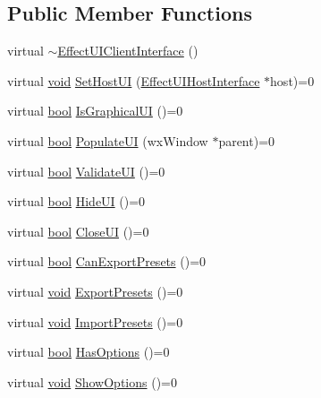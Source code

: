 \subsection*{Public Member Functions}
\begin{DoxyCompactItemize}
\item 
virtual \hyperlink{class_effect_u_i_client_interface_a1292c3f924bf688755da923aff85e106}{$\sim$\+Effect\+U\+I\+Client\+Interface} ()
\item 
virtual \hyperlink{sound_8c_ae35f5844602719cf66324f4de2a658b3}{void} \hyperlink{class_effect_u_i_client_interface_a486ec923d94d70b91278520903977152}{Set\+Host\+UI} (\hyperlink{class_effect_u_i_host_interface}{Effect\+U\+I\+Host\+Interface} $\ast$host)=0
\item 
virtual \hyperlink{mac_2config_2i386_2lib-src_2libsoxr_2soxr-config_8h_abb452686968e48b67397da5f97445f5b}{bool} \hyperlink{class_effect_u_i_client_interface_ac5bd459c397afc1d76576bfe282f90fe}{Is\+Graphical\+UI} ()=0
\item 
virtual \hyperlink{mac_2config_2i386_2lib-src_2libsoxr_2soxr-config_8h_abb452686968e48b67397da5f97445f5b}{bool} \hyperlink{class_effect_u_i_client_interface_ac9903541be5f74fa381e04923b9f97a6}{Populate\+UI} (wx\+Window $\ast$parent)=0
\item 
virtual \hyperlink{mac_2config_2i386_2lib-src_2libsoxr_2soxr-config_8h_abb452686968e48b67397da5f97445f5b}{bool} \hyperlink{class_effect_u_i_client_interface_acb9e8d7c50e97548e9f6235621bbe2bd}{Validate\+UI} ()=0
\item 
virtual \hyperlink{mac_2config_2i386_2lib-src_2libsoxr_2soxr-config_8h_abb452686968e48b67397da5f97445f5b}{bool} \hyperlink{class_effect_u_i_client_interface_ae62b2cfaf64654ba9c16a375fce66987}{Hide\+UI} ()=0
\item 
virtual \hyperlink{mac_2config_2i386_2lib-src_2libsoxr_2soxr-config_8h_abb452686968e48b67397da5f97445f5b}{bool} \hyperlink{class_effect_u_i_client_interface_a42663b4c579a1d5f091c716d1bf9810e}{Close\+UI} ()=0
\item 
virtual \hyperlink{mac_2config_2i386_2lib-src_2libsoxr_2soxr-config_8h_abb452686968e48b67397da5f97445f5b}{bool} \hyperlink{class_effect_u_i_client_interface_ae6c023f6c7be0a81337e8c473ab6ce1d}{Can\+Export\+Presets} ()=0
\item 
virtual \hyperlink{sound_8c_ae35f5844602719cf66324f4de2a658b3}{void} \hyperlink{class_effect_u_i_client_interface_a0cee530b627e016a57eaf31701990e4f}{Export\+Presets} ()=0
\item 
virtual \hyperlink{sound_8c_ae35f5844602719cf66324f4de2a658b3}{void} \hyperlink{class_effect_u_i_client_interface_a64339e6523da0dd67763b7409fee55ea}{Import\+Presets} ()=0
\item 
virtual \hyperlink{mac_2config_2i386_2lib-src_2libsoxr_2soxr-config_8h_abb452686968e48b67397da5f97445f5b}{bool} \hyperlink{class_effect_u_i_client_interface_af7090aec6cdd432972116ae52ff8a59e}{Has\+Options} ()=0
\item 
virtual \hyperlink{sound_8c_ae35f5844602719cf66324f4de2a658b3}{void} \hyperlink{class_effect_u_i_client_interface_a70afecbb355620aee4d2f809c745153d}{Show\+Options} ()=0
\end{DoxyCompactItemize}


